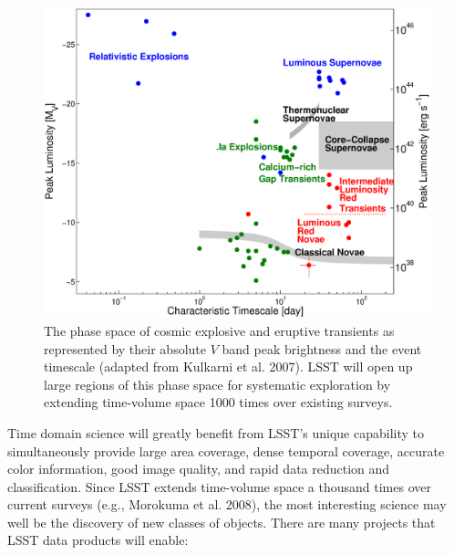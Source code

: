\documentclass{emulateapj}
\begin{document}
\begin{figure}
\hskip -0.1in
\vskip -0.1in
\includegraphics[width=1.0\hsize,clip]{taumv.ps}
\caption{The phase space of cosmic explosive and eruptive transients as
represented by their absolute $V$ band peak brightness and the 
event timescale (adapted from Kulkarni et al. 2007). LSST will open up large 
regions of this phase space for systematic exploration by extending
time-volume space 1000 times over existing surveys.} 
\label{Fig:shri}
\end{figure}



Time domain science will greatly benefit from LSST's unique capability to simultaneously
provide large area coverage, dense temporal coverage, accurate color information,
good image quality, and rapid data reduction and classification. Since LSST extends 
time-volume space a thousand times over current surveys (e.g., Morokuma et al. 2008), 
the most interesting science may well be the discovery of new classes of objects.  
There are many projects that LSST data products will enable:
\end{document}
